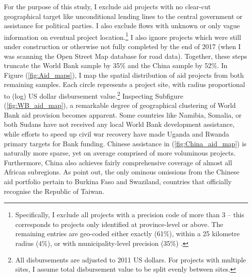 \documentclass[11pt, oneside]{article}   	%
\let\oldref\ref
\renewcommand{\ref}[1]{(\oldref{#1})}
\begin{document}
For the purpose of this study, I exclude aid projects with no clear-cut geographical target like unconditional lending lines to the central government or assistance for political parties. I also exclude flows with unknown or only vague information on eventual project location.\footnote{Specifically, I exclude all projects with a precision code of more than 3 -- this corresponds to projects only identified at province-level or above. The remaining entries are geo-coded either exactly (61\%), within a 25 kilometre radius (4\%), or with municipality-level precision (35\%) \citep{Strandow_UCDPAidDatacodebook_2011a}.} I also ignore projects which were still under construction or otherwise not fully completed by the end of 2017 (when I was scanning the Open Street Map database for road data). Together, these steps truncate the World Bank sample by 35\% and the China sample by 52\%. In Figure \ref{fig:Aid_maps}, I map the spatial distribution of aid projects from both remaining samples. Each circle represents a project site, with radius proportional to (log) US dollar disbursement value.\footnote{All disbursements are adjusted to 2011 US dollars. For projects with multiple sites, I assume total disbursement value to be split evenly between sites.} Inspecting Subfigure \ref{fig:WB_aid_map}, a remarkable degree of geographical clustering of World Bank aid provision becomes apparent. Some countries like Namibia, Somalia, or both Sudans have not received any local World Bank development assistance, while efforts to speed up civil war recovery have made Uganda and Rwanda primary targets for Bank funding. Chinese assistance in \ref{fig:China_aid_map} is naturally more sparse, yet on average comprised of more voluminous projects. Furthermore, China also achieves fairly comprehensive coverage of almost all African subregions. As \cite{Strange_TrackingUnderreportedFinancial_2017} point out, the only ominous omissions from the Chinese aid portfolio pertain to Burkina Faso and Swaziland, countries that officially recognise the Republic of Taiwan.
\end{document}
